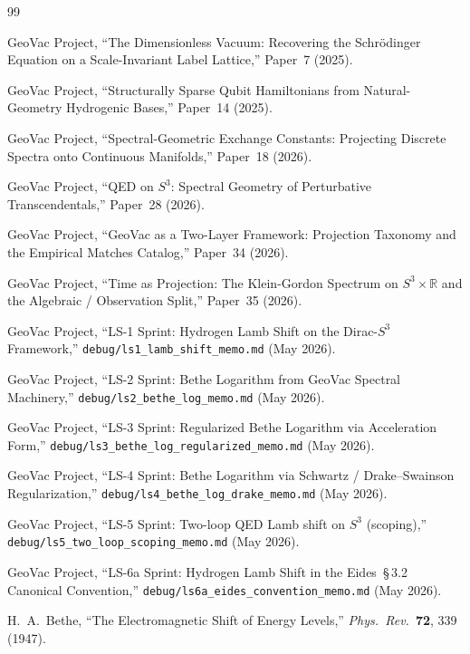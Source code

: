 \documentclass[11pt]{article}
\begin{document}
\begin{thebibliography}{99}

GeoVac Project, ``The Dimensionless Vacuum: Recovering the Schr\"odinger
Equation on a Scale-Invariant Label Lattice,'' Paper~7 (2025).

GeoVac Project, ``Structurally Sparse Qubit Hamiltonians from Natural-Geometry
Hydrogenic Bases,'' Paper~14 (2025).

GeoVac Project, ``Spectral-Geometric Exchange Constants: Projecting
Discrete Spectra onto Continuous Manifolds,'' Paper~18 (2026).

GeoVac Project, ``QED on $S^3$: Spectral Geometry of Perturbative
Transcendentals,'' Paper~28 (2026).

GeoVac Project, ``GeoVac as a Two-Layer Framework: Projection
Taxonomy and the Empirical Matches Catalog,'' Paper~34 (2026).

GeoVac Project, ``Time as Projection: The Klein-Gordon Spectrum on
$S^3 \times \mathbb{R}$ and the Algebraic / Observation Split,''
Paper~35 (2026).

GeoVac Project, ``LS-1 Sprint: Hydrogen Lamb Shift on the Dirac-$S^3$
Framework,'' \texttt{debug/ls1\_lamb\_shift\_memo.md} (May 2026).

GeoVac Project, ``LS-2 Sprint: Bethe Logarithm from GeoVac Spectral
Machinery,'' \texttt{debug/ls2\_bethe\_log\_memo.md} (May 2026).

GeoVac Project, ``LS-3 Sprint: Regularized Bethe Logarithm via
Acceleration Form,'' \texttt{debug/ls3\_bethe\_log\_regularized\_memo.md}
(May 2026).

GeoVac Project, ``LS-4 Sprint: Bethe Logarithm via Schwartz /
Drake--Swainson Regularization,''
\texttt{debug/ls4\_bethe\_log\_drake\_memo.md} (May 2026).

GeoVac Project, ``LS-5 Sprint: Two-loop QED Lamb shift on $S^3$
(scoping),'' \texttt{debug/ls5\_two\_loop\_scoping\_memo.md} (May 2026).

GeoVac Project, ``LS-6a Sprint: Hydrogen Lamb Shift in the
Eides~\S\,3.2 Canonical Convention,''
\texttt{debug/ls6a\_eides\_convention\_memo.md} (May 2026).

H.~A.~Bethe, ``The Electromagnetic Shift of Energy Levels,''
\textit{Phys.\ Rev.}\ \textbf{72}, 339 (1947).


\end{thebibliography}
\end{document}
